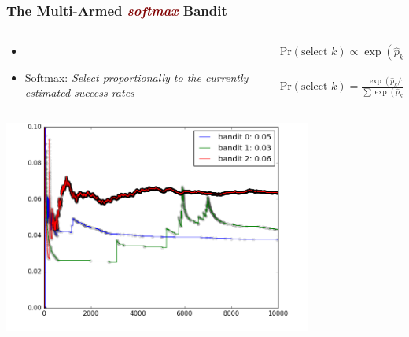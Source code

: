 \documentclass[xcolor={dvipsnames}]{beamer}
\begin{document}
\frame
{
\frametitle{The Multi-Armed \textcolor{Maroon}{\emph{softmax}} Bandit}

\vspace{.5em}
\begin{columns}
   \begin{column}{0.5\textwidth}
\setlength{\leftmargini}{9pt}
\vspace{-25pt}
\begin{itemize}
\item[] 
\item[] Softmax: \emph{Select proportionally to the currently estimated success rates} 
\vspace{3.85em}
\end{itemize}

\end{column}
\begin{column}{0.5\textwidth}

\vspace{-2.8em}
$\text{Pr}(\text{select } k) \propto  \exp(\hat p_k/\tau), \text{ i.e.,}$\\
${}$\\
$\text{Pr}(\text{select } k) =  \frac{\exp(\hat p_k/\tau)}{\sum \exp(\hat p_k/\tau)}$
        \end{column}
\vspace{-1.5em}
\end{columns}

\vspace{-.42in}
\hspace*{.5em} \includegraphics[height=2.755in]{stuff/mab_sm.png}


}
\end{document}
